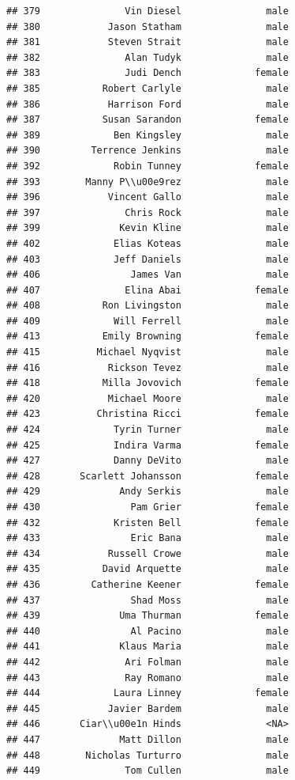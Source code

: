 \documentclass[
]{article}
\begin{document}
\begin{verbatim}
## 379               Vin Diesel               male
## 380            Jason Statham               male
## 381            Steven Strait               male
## 382               Alan Tudyk               male
## 383               Judi Dench             female
## 385           Robert Carlyle               male
## 386            Harrison Ford               male
## 387           Susan Sarandon             female
## 389             Ben Kingsley               male
## 390         Terrence Jenkins               male
## 392             Robin Tunney             female
## 393        Manny P\\u00e9rez               male
## 396            Vincent Gallo               male
## 397               Chris Rock               male
## 399              Kevin Kline               male
## 402             Elias Koteas               male
## 403             Jeff Daniels               male
## 406                James Van               male
## 407               Elina Abai             female
## 408           Ron Livingston               male
## 409             Will Ferrell               male
## 413           Emily Browning             female
## 415          Michael Nyqvist               male
## 416            Rickson Tevez               male
## 418           Milla Jovovich             female
## 420            Michael Moore               male
## 423          Christina Ricci             female
## 424             Tyrin Turner               male
## 425             Indira Varma             female
## 427             Danny DeVito               male
## 428       Scarlett Johansson             female
## 429              Andy Serkis               male
## 430                Pam Grier             female
## 432             Kristen Bell             female
## 433                Eric Bana               male
## 434            Russell Crowe               male
## 435           David Arquette               male
## 436         Catherine Keener             female
## 437                Shad Moss               male
## 439              Uma Thurman             female
## 440                Al Pacino               male
## 441              Klaus Maria               male
## 442               Ari Folman               male
## 443               Ray Romano               male
## 444             Laura Linney             female
## 445            Javier Bardem               male
## 446       Ciar\\u00e1n Hinds               <NA>
## 447              Matt Dillon               male
## 448        Nicholas Turturro               male
## 449               Tom Cullen               male

\end{verbatim}
\end{document}
